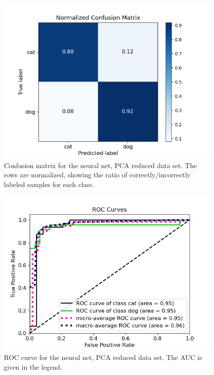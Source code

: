 \documentclass[a4paper]{article}
\begin{document}
\begin{figure}[H]
	\centering
	\includegraphics[scale=0.6]{../figures/neural_net/confusion_matrix_nbins200_pca35_seed4155_ts0.20.png}
	\caption{Confusion matrix for the neural net, PCA reduced data set. The rows are normalized, showing the ratio of correctly/incorrectly labeled samples for each class.}
	\label{fig:nn_confusion_pca}
\end{figure}	

\begin{figure}[H]
	\centering
	\includegraphics[scale=0.5]{../figures/neural_net/roc_nbins200_pca35_seed4155_ts0.20.png}
	\caption{ROC curve for the neural net, PCA reduced data set. The AUC is given in the legend.}
	\label{fig:nn_roc_pca}
\end{figure}	
\end{document}
